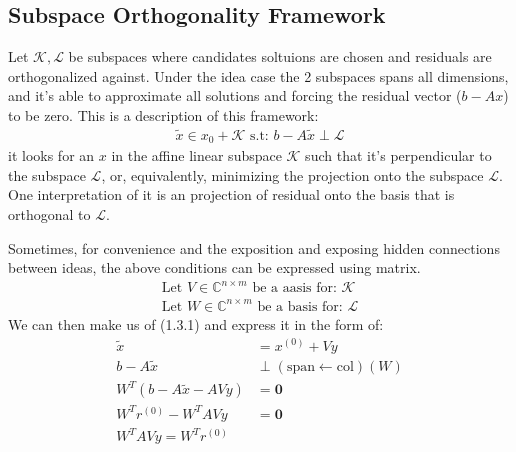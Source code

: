 \documentclass[]{article}
\theoremstyle{definition}
\begin{document}
    \subsection{Subspace Orthogonality Framework}
        Let $\mathcal K, \mathcal L$ be subspaces where candidates soltuions are chosen and residuals are orthogonalized against. Under the idea case the 2 subspaces spans all dimensions, and it's able to approximate all solutions and forcing the residual vector ($b - Ax$) to be zero. This is a description of this framework: 
        \begin{align}
            \tilde{x} \in x_0 + \mathcal{K} \text{ s.t: } b - A\tilde{x} \perp \mathcal{L}
        \end{align}
        it looks for an $x$ in the affine linear subspace $\mathcal{K}$ such that it's perpendicular to the subspace $\mathcal{L}$, or, equivalently, minimizing the projection onto the subspace $\mathcal{L}$. One interpretation of it is an projection of residual onto the basis that is orthogonal to $\mathcal L$. 
        \par
        Sometimes, for convenience and the exposition and exposing hidden connections between ideas, the above conditions can be expressed using matrix. 
        \begin{align}
            \text{Let } V \in \mathbb{C}^{n\times m} \text{ be a aasis for: }\mathcal{K}
            \\
            \text{Let } W \in \mathbb{C}^{n\times m} \text{ be a basis for: } \mathcal{L}
        \end{align}
        We can then make us of (1.3.1) and express it in the form of: 
        \begin{align}
            \tilde{x} &= x^{(0)} + Vy
            \\
            b - A\tilde{x}  &\perp (\text{span}\leftarrow \text{col})(W)
            \\
            W^T(b - A\tilde{x} - AVy) &= \mathbf{0}
            \\
            W^Tr^{(0)} - W^TAVy&= \mathbf{0}
            \\
            W^TAVy = W^Tr^{(0)}
        \end{align}
\end{document}
